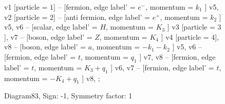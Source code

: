 \documentclass{revtex4}
\begin{document}
\begin{figure}[!htb]
\begin{center}
{    %
v1 [particle = \(1\)] -- [fermion, edge label' = \(e^{-}\), momentum = \(k_{1}\) ] v5, 
v2 [particle = \(2\)] -- [anti fermion, edge label' = \(e^{+}\), momentum = \(k_{2}\) ] v5, 
v6 -- [scalar, edge label' = \(H\), momentum = \(K_{3}\) ] v3 [particle = \(3\)], 
v7 -- [boson, edge label' = \(Z\), momentum = \(K_{4}\) ] v4 [particle = \(4\)], 
v8 -- [boson, edge label' = \(a\), momentum = \(-k_{1} - k_{2}\) ] v5, 
v6 -- [fermion, edge label' = \(t\), momentum = \(q_{1}\) ] v7, 
v8 -- [fermion, edge label' = \(t\), momentum = \(K_{3} + q_{1}\) ] v6, 
v7 -- [fermion, edge label' = \(t\), momentum = \(-K_{4} + q_{1}\) ] v8, 
};
\end{center}
\caption{Diagram83, Sign: -1, Symmetry factor: 1}
\end{figure}
\newpage
\end{document}
